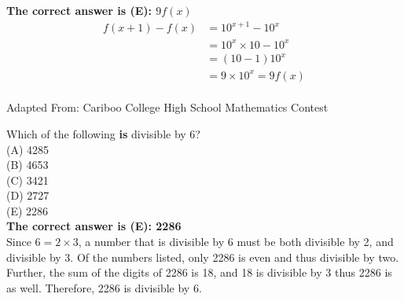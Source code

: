 \documentclass{article}
\begin{document}

\textbf{The correct answer is (E): $9f(x)$}\\
\begin{align*}
f(x+1)-f(x)&=10^{x+1}-10^x\\
&=10^{x}\times10-10^x\\
&=(10-1)10^x\\
&=9\times10^x=9f(x)
\end{align*}
\\[5 ex]

\scriptsize
Adapted From: Cariboo College High School Mathematics Contest

\normalsize
Which of the following  \textbf{is} divisible by 6?\\
(A) 4285\\
(B) 4653\\
(C) 3421\\
(D) 2727\\
(E) 2286\\


\textbf{The correct answer is (E): 2286}\\
Since $6=2\times3$, a number that is divisible by 6 must be both divisible by 2, and divisible by 3.  Of the numbers listed, only 2286 is even and thus divisible by two. Further, the sum of the digits of 2286 is 18, and 18 is divisible by 3 thus 2286 is as well. Therefore, 2286 is divisible by 6.
\\[5 ex]
\end{document}
